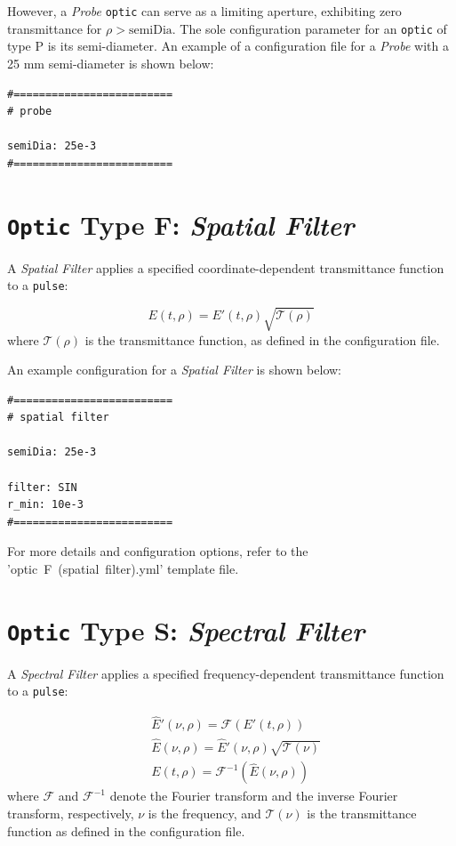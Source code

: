 \documentclass{report}
\begin{document}
However, a \textit{Probe} \texttt{optic} can serve as a limiting aperture, exhibiting zero transmittance for \( \rho > \text{semiDia} \). The sole configuration parameter for an \texttt{optic} of type P is its semi-diameter. An example of a configuration file for a \textit{Probe} with a 25 mm semi-diameter is shown below:

\begin{verbatim}
#=========================
# probe

semiDia: 25e-3
#=========================
\end{verbatim}


\section{\texttt{Optic} Type F: \textit{Spatial Filter}}
A \textit{Spatial Filter} applies a specified coordinate-dependent transmittance function to a \texttt{pulse}:

\begin{equation}
E(t,\rho) = E'(t,\rho) \sqrt{\mathcal{T}(\rho)}
\end{equation}
where \( \mathcal{T}(\rho) \) is the transmittance function, as defined in the configuration file.

An example configuration for a \textit{Spatial Filter} is shown below:

\begin{verbatim}
#=========================
# spatial filter

semiDia: 25e-3

filter: SIN
r_min: 10e-3
#=========================
\end{verbatim}

For more details and configuration options, refer to the 'optic~F~(spatial~filter).yml' template file.


\section{\texttt{Optic} Type S: \textit{Spectral Filter}}
A \textit{Spectral Filter} applies a specified frequency-dependent transmittance function to a \texttt{pulse}:

\begin{equation}
 \begin{aligned}
  &\widehat{E}'(\nu,\rho) = \mathcal{F}(E'(t,\rho))\\
  &\widehat{E}(\nu,\rho) = \widehat{E}'(\nu,\rho) \sqrt{\mathcal{T}(\nu)}\\
  &E(t,\rho) = \mathcal{F}^{-1}(\widehat{E}(\nu,\rho))
 \end{aligned}
\end{equation}
where \( \mathcal{F} \) and \( \mathcal{F}^{-1} \) denote the Fourier transform and the inverse Fourier transform, respectively, \( \nu \) is the frequency, and \( \mathcal{T}(\nu) \) is the transmittance function as defined in the configuration file.
\end{document}
